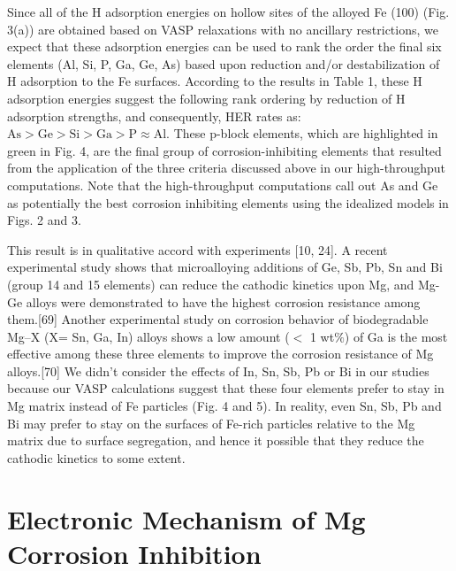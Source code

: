 Since all of the H adsorption energies on hollow sites of the alloyed Fe (100) (Fig. 3(a)) are obtained based on VASP relaxations with no ancillary restrictions, we expect that these adsorption energies can be used to rank the order the final six elements (Al, Si, P, Ga, Ge, As) based upon reduction and/or destabilization of H adsorption to the Fe surfaces. According to the results in Table 1, these H adsorption energies suggest the following rank ordering by reduction of H adsorption strengths, and consequently, HER rates as: $\text{As} > \text{Ge} > \text{Si} > \text{Ga} > \text{P} \approx \text{Al}$. These p-block elements, which are highlighted in green in Fig. 4, are the final group of corrosion-inhibiting elements that resulted from the application of the three criteria discussed above in our high-throughput computations. Note that the high-throughput computations call out As and Ge as potentially the best corrosion inhibiting elements using the idealized models in Figs. 2 and 3. 

This result is in qualitative accord with experiments [10, 24]. A recent experimental study shows that microalloying additions of Ge, Sb, Pb, Sn and Bi (group 14 and 15 elements) can reduce the cathodic kinetics upon Mg, and Mg-Ge alloys were demonstrated to have the highest corrosion resistance among them.[69] Another experimental study on corrosion behavior of biodegradable Mg–X (X= Sn, Ga, In) alloys shows a low amount ($<$ 1 wt$\%$) of Ga is the most effective among these three elements to improve the corrosion resistance of Mg alloys.[70] We didn't consider the effects of In, Sn, Sb, Pb or Bi in our studies because our \ac{VASP} calculations suggest that these four elements prefer to stay in Mg matrix instead of Fe particles (Fig. 4 and 5). In reality, even Sn, Sb, Pb and Bi may prefer to stay on the surfaces of Fe-rich particles relative to the Mg matrix due to surface segregation, and hence it possible that they reduce the cathodic kinetics to some extent. 

\section{Electronic Mechanism of Mg Corrosion Inhibition}

